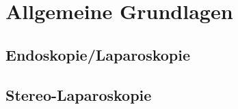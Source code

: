 \chapter[Allgemeine Grundlagen]{Allgemeine Grundlagen}\label{sec:grundlagen}

\section[Endoskopie/Laparoskopie]{Endoskopie/Laparoskopie}\label{sec:endoskopie}

\section[Stereo-Laparoskopie]{Stereo-Laparoskopie}\label{sec:stereo_laparoskopie}
